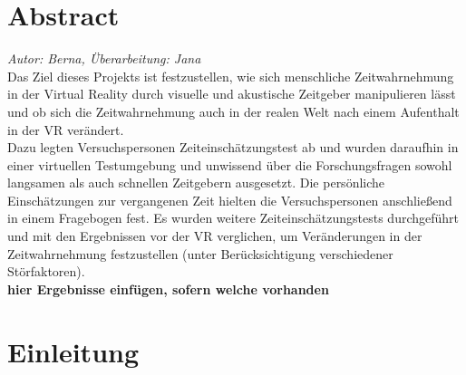 \documentclass{Paper}
\begin{document}
\maketitle


\tableofcontents
\clearpage

\section*{Abstract}
	\textit{Autor: Berna, Überarbeitung: Jana}\\
Das Ziel dieses Projekts ist festzustellen, wie sich menschliche Zeitwahrnehmung in der Virtual Reality durch visuelle und akustische Zeitgeber manipulieren lässt und ob sich die Zeitwahrnehmung auch in der realen Welt nach einem Aufenthalt in der VR verändert.\\
Dazu legten Versuchspersonen Zeiteinschätzungstest ab und wurden daraufhin in einer virtuellen Testumgebung und unwissend über die Forschungsfragen sowohl langsamen als auch schnellen Zeitgebern ausgesetzt. 
Die persönliche Einschätzungen zur vergangenen Zeit hielten die Versuchspersonen anschließend in einem Fragebogen fest. Es wurden weitere Zeiteinschätzungstests durchgeführt und mit den Ergebnissen vor der VR verglichen, um Veränderungen in der Zeitwahrnehmung festzustellen (unter Berücksichtigung verschiedener Störfaktoren).\\
\textbf{hier Ergebnisse einfügen, sofern welche vorhanden}



\section{Einleitung}
\end{document}
